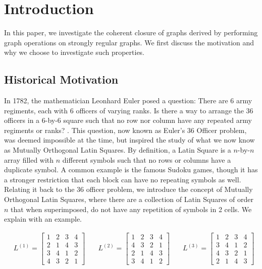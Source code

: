 \section{Introduction}

In this paper, we investigate the coherent closure of graphs derived by performing graph operations on strongly regular graphs. We first discuss the motivation and why we choose to investigate such properties.

\subsection{Historical Motivation}

In 1782, the mathematician Leonhard Euler posed a question: There are 6 army regiments, each with 6 officers of varying ranks. Is there a way to arrange the 36 officers in a 6-by-6 square such that no row nor column have any repeated army regiments or ranks? \cite{euler-36-officers-problem}. This question, now known as Euler's 36 Officer problem, was deemed impossible at the time, but inspired the study of what we now know as Mutually Orthogonal Latin Squares. By definition, a Latin Square is a $n$-by-$n$ array filled with $n$ different symbols such that no rows or columns have a duplicate symbol. A common example is the famous Sudoku games, though it has a stronger restriction that each block can have no repeating symbols as well. Relating it back to the 36 officer problem, we introduce the concept of Mutually Orthogonal Latin Squares, where there are a collection of Latin Squares of order $n$ that when superimposed, do not have any repetition of symbols in 2 cells. We explain with an example.

\[
\begin{aligned}
    &L^{(1)} = \begin{bmatrix}
        1 & 2 & 3 & 4\\
        2 & 1 & 4 & 3\\
        3 & 4 & 1 & 2\\
        4 & 3 & 2 & 1
    \end{bmatrix}\quad 
    &L^{(2)} = \begin{bmatrix}
        1 & 2 & 3 & 4\\
        4 & 3 & 2 & 1\\
        2 & 1 & 4 & 3\\
        3 & 4 & 1 & 2
    \end{bmatrix}\quad
    &L^{(3)} = \begin{bmatrix}
        1&2&3&4\\
        3&4&1&2\\
        4&3&2&1\\
        2&1&4&3
    \end{bmatrix}
\end{aligned}
\label{MOLS of order 4}
\]

